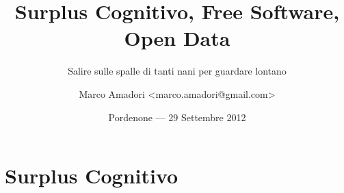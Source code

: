 \documentclass[italian,compress,red]{beamer}
\title[Software e Surplus Cognitivo]{Surplus Cognitivo, Free Software, Open Data}
\subtitle{Salire sulle spalle di tanti nani per guardare lontano}
\author[Marco Amadori]{Marco Amadori <marco.amadori@gmail.com>}
\institute{SpazioDati s.r.l --- \url{http://spaziodati.eu} \\
           Fondazione Bruno Kessler --- \url{http://www.fbk.eu}}
\date{\scriptsize Pordenone --- \vspace{.10cm}29 Settembre 2012}
\begin{document}
\begin{frame}[plain]
  \titlepage
  \begin{center}%
    \end{center}%
    \vfill
   {\tiny\CcNote{\CcLongnameBySa}} 
 
\end{frame}







\section{Surplus Cognitivo}
\end{document}
